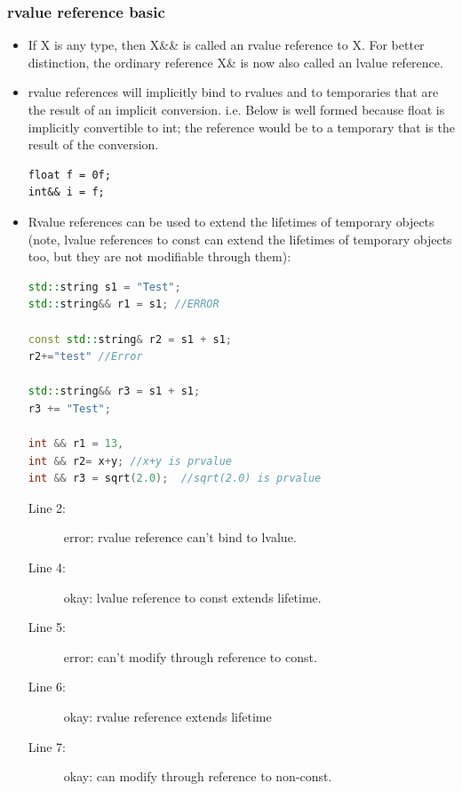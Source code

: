 \documentclass[a4paper,11pt,twoside]{book}
\begin{document}
\subsubsection{rvalue reference basic}
\begin{itemize}
	\item If X is any type, then X\&\& is called an rvalue reference to X. For better distinction, the ordinary reference X\& is now also called an lvalue reference.
	
	\item rvalue references will implicitly bind to rvalues and to temporaries that are the result of an implicit conversion. i.e. Below is well formed because float is implicitly convertible to int; the reference would be to a temporary that is the result of the conversion.
\begin{lstlisting}
float f = 0f; 
int&& i = f; 
\end{lstlisting}
	
	\item Rvalue references can be used to extend the lifetimes of temporary objects (note, lvalue references to const can extend the lifetimes of temporary objects too, but they are not modifiable through them):
	
\begin{lstlisting}[frame=single, language=c++, mathescape=true]
std::string s1 = "Test";
std::string&& r1 = s1; //ERROR
		
const std::string& r2 = s1 + s1; 
r2+="test" //Error
		
std::string&& r3 = s1 + s1;      
r3 += "Test";                    

int && r1 = 13,  
int && r2= x+y; //x+y is prvalue
int && r3 = sqrt(2.0);  //sqrt(2.0) is prvalue

\end{lstlisting}
	\begin{description}
		\item[Line 2:]  error: rvalue reference can't bind to lvalue.
		
		\item[Line 4:] okay: lvalue reference to const extends lifetime.
		
		\item[Line 5:] error: can't modify through reference to const.
		\item[Line 6:] okay: rvalue reference extends lifetime
		\item[Line 7:] okay: can modify through reference to non-const.
	\end{description}
	

\end{itemize}
\end{document}
